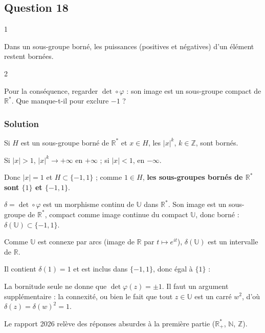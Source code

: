 \documentclass[11pt,a4paper]{article}
\newcommand{\equationajustee}[1]{%
  \sbox{\boiteequation}{$\displaystyle #1$}%
  \ifdim\wd\boiteequation>\linewidth
    \[\resizebox{\linewidth}{!}{\usebox{\boiteequation}}\]%
  \else
    \[#1\]%
  \fi}
\begin{document}
\hypertarget{question-18}{%
\subsection{Question 18}\label{question-18}}

\begin{indication}{1}

Dans un sous-groupe borné, les puissances (positives et négatives) d'un élément restent bornées.

\end{indication}

\begin{indication}{2}

Pour la conséquence, regarder \(\det\circ\varphi\) : son image est un sous-groupe compact de \({\mathbb{R}}^*\). Que manque-t-il pour exclure \(-1\) ?

\end{indication}

\hypertarget{solution-17}{%
\subsubsection{Solution}\label{solution-17}}

Si \(H\) est un sous-groupe borné de \({\mathbb{R}}^*\) et \(x\in H\), les \(|x|^k\), \(k\in\mathbb{Z}\), sont bornés.

Si \(|x|>1\), \(|x|^k\to+\infty\) en \(+\infty\) ; si \(|x|<1\), en \(-\infty\).

Donc \(|x|=1\) et \(H\subset\{-1,1\}\) ; comme \(1\in H\), \textbf{les sous-groupes bornés de \({\mathbb{R}}^*\) sont \(\{1\}\) et \(\{-1,1\}\)}.

\(\delta=\det\circ\varphi\) est un morphisme continu de \(\mathbb{U}\) dans \({\mathbb{R}}^*\). Son image est un sous-groupe de \({\mathbb{R}}^*\), compact comme image continue du compact \(\mathbb{U}\), donc borné : \(\delta(\mathbb{U})\subset\{-1,1\}\).

Comme \(\mathbb{U}\) est connexe par arcs (image de \(\mathbb{R}\) par \(t\mapsto e^{it}\)), \(\delta(\mathbb{U})\) est un intervalle de \(\mathbb{R}\).

Il contient \(\delta(1)=1\) et est inclus dans \(\{-1,1\}\), donc égal à \(\{1\}\) :

\equationajustee{\boxed{\varphi(\mathbb{U})\subset{\mathrm{SL}}_n(\mathbb{R}).}}

\begin{piege}

La bornitude seule ne donne que \(\det\varphi(z)=\pm1\). Il faut un argument supplémentaire : la connexité, ou bien le fait que tout \(z\in\mathbb{U}\) est un carré \(w^2\), d'où \(\delta(z)=\delta(w)^2=1\).

Le rapport 2026 relève des réponses absurdes à la première partie (\({\mathbb{R}}_+^*\), \(\mathbb{N}\), \(\mathbb{Z}\)).

\end{piege}
\end{document}
